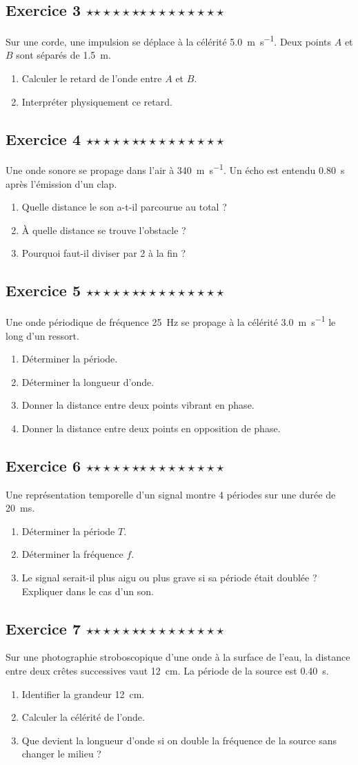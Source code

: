 \documentclass[11pt,a4paper]{article}
\newcommand{\etoiles}[1]{%
\ifcase#1\or $\star$\or $\star\star$\or $\star\star\star$\or $\star\star\star\star$\or $\star\star\star\star\star$\fi}
\newcommand{\exostar}[2]{\subsection*{Exercice #1 \hfill \etoiles{#2}}}
\begin{document}
\exostar{3}{1}
Sur une corde, une impulsion se déplace à la célérité \SI{5,0}{m.s^{-1}}. Deux points $A$ et $B$ sont séparés de \SI{1,5}{m}.
\begin{enumerate}[label=\alph*)]
    \item Calculer le retard de l'onde entre $A$ et $B$.
    \item Interpréter physiquement ce retard.
\end{enumerate}

\exostar{4}{1}
Une onde sonore se propage dans l'air à \SI{340}{m.s^{-1}}. Un écho est entendu \SI{0,80}{s} après l'émission d'un clap.
\begin{enumerate}[label=\alph*)]
    \item Quelle distance le son a-t-il parcourue au total ?
    \item À quelle distance se trouve l'obstacle ?
    \item Pourquoi faut-il diviser par 2 à la fin ?
\end{enumerate}

\exostar{5}{2}
Une onde périodique de fréquence \SI{25}{Hz} se propage à la célérité \SI{3,0}{m.s^{-1}} le long d'un ressort.
\begin{enumerate}[label=\alph*)]
    \item Déterminer la période.
    \item Déterminer la longueur d'onde.
    \item Donner la distance entre deux points vibrant en phase.
    \item Donner la distance entre deux points en opposition de phase.
\end{enumerate}

\exostar{6}{2}
Une représentation temporelle d'un signal montre 4 périodes sur une durée de \SI{20}{ms}.
\begin{enumerate}[label=\alph*)]
    \item Déterminer la période $T$.
    \item Déterminer la fréquence $f$.
    \item Le signal serait-il plus aigu ou plus grave si sa période était doublée ? Expliquer dans le cas d'un son.
\end{enumerate}

\exostar{7}{2}
Sur une photographie stroboscopique d'une onde à la surface de l'eau, la distance entre deux crêtes successives vaut \SI{12}{cm}. La période de la source est \SI{0,40}{s}.
\begin{enumerate}[label=\alph*)]
    \item Identifier la grandeur \SI{12}{cm}.
    \item Calculer la célérité de l'onde.
    \item Que devient la longueur d'onde si on double la fréquence de la source sans changer le milieu ?
\end{enumerate}
\end{document}
